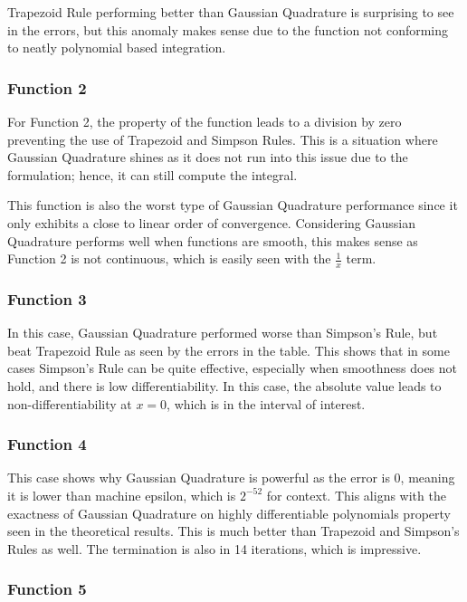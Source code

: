\documentclass[12pt]{article}
\begin{document}
Trapezoid Rule performing better than Gaussian Quadrature is surprising to see in the errors, but this anomaly makes sense due to the function not conforming to neatly polynomial based integration.

\subsubsection{Function 2}

For Function 2, the property of the function leads to a division by zero preventing the use of Trapezoid and Simpson Rules. This is a situation where Gaussian Quadrature shines as it does not run into this issue due to the formulation; hence, it can still compute the integral. 

This function is also the worst type of Gaussian Quadrature performance since it only exhibits a close to linear order of convergence. Considering Gaussian Quadrature performs well when functions are smooth, this makes sense as Function 2 is not continuous, which is easily seen with the $\frac{1}{x}$ term.

\subsubsection{Function 3}

In this case, Gaussian Quadrature performed worse than Simpson's Rule, but beat Trapezoid Rule as seen by the errors in the table. This shows that in some cases Simpson's Rule can be quite effective, especially when smoothness does not hold, and there is low differentiability. In this case, the absolute value leads to non-differentiability at $x = 0$, which is in the interval of interest.

\subsubsection{Function 4}

This case shows why Gaussian Quadrature is powerful as the error is 0, meaning it is lower than machine epsilon, which is $2^{-52}$ for context. This aligns with the exactness of Gaussian Quadrature on highly differentiable polynomials property seen in the theoretical results. This is much better than Trapezoid and Simpson's Rules as well. The termination is also in 14 iterations, which is impressive.

\subsubsection {Function 5}
\end{document}
